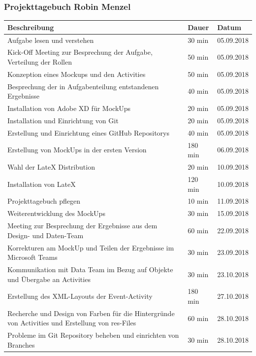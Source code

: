\newpage
\subsubsection{Projekttagebuch Robin Menzel}
\begin{longtable}{|p{10cm}|p{2cm}|p{2cm}|}
\hline
{\textbf{Beschreibung}} & {\textbf{Dauer}} & {\textbf{Datum}} \\ \hline
Aufgabe lesen und verstehen & 30 min & 05.09.2018 \\ \hline
Kick-Off Meeting zur Besprechung der Aufgabe, Verteilung der Rollen & 50 min & 05.09.2018 \\ \hline
Konzeption eines Mockups und den Activities & 50 min & 05.09.2018 \\ \hline
Besprechung der in Aufgabenteilung entstandenen Ergebnisse & 40 min & 05.09.2018 \\ \hline
Installation von Adobe XD für MockUps & 20 min & 05.09.2018 \\ \hline
Installation und Einrichtung von Git & 20 min & 05.09.2018 \\ \hline
Erstellung und Einrichtung eines GitHub Repositorys & 40 min & 05.09.2018 \\ \hline
Erstellung von MockUps in der ersten Version & 180 min & 06.09.2018 \\ \hline
Wahl der LateX Distribution & 20 min & 10.09.2018 \\ \hline
Installation von LateX & 120 min & 10.09.2018 \\ \hline
Projekttagebuch pflegen & 10 min & 11.09.2018\\ \hline
Weiterentwicklung des MockUps & 30 min & 15.09.2018\\ \hline
Meeting zur Besprechung der Ergebnisse aus dem Design- und Daten-Team & 60 min & 22.09.2018\\ \hline
Korrekturen am MockUp und Teilen der Ergebnisse im Microsoft Teams & 30 min & 23.09.2018\\ \hline
Kommunikation mit Data Team im Bezug auf Objekte und Übergabe an Activities & 30 min & 23.10.2018 \\ \hline
Erstellung des XML-Layouts der Event-Activity & 180 min & 27.10.2018\\ \hline
Recherche und Design von Farben für die Hintergründe von Activities und Erstellung von res-Files & 60 min & 28.10.2018\\ \hline
Probleme im Git Repository beheben und einrichten von Branches & 30 min & 28.10.2018\\ \hline

\end{longtable}
